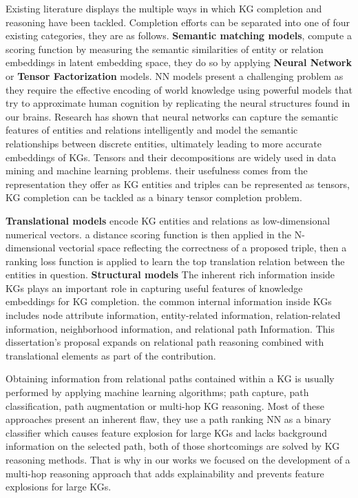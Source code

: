 Existing literature displays the multiple ways in which KG completion and reasoning have been tackled. Completion efforts can be separated into one of four existing categories\cite{shen2022comprehensive}, they are as follows.
\textbf{Semantic matching models}, compute a scoring function by measuring the semantic similarities of entity or relation embeddings in latent embedding space, they do so by applying \textbf{Neural Network} or \textbf{Tensor Factorization} models. 
NN models \cite{socher2013reasoning, tran2020multi} present a challenging problem as they require the effective encoding of world knowledge using powerful models that try to approximate human cognition by replicating the neural structures found in our brains. Research has shown that neural networks can capture the semantic features of entities and relations intelligently and model the semantic relationships between discrete entities, ultimately leading to more accurate embeddings of KGs.
Tensors\cite{nickel2011three, balavzevic2019tucker, socher2013reasoning, } and their decompositions are widely used in data mining and machine learning problems. their usefulness comes from the representation they offer as KG entities and triples can be represented as tensors, KG completion can be tackled as a binary tensor completion problem\cite{shen2022comprehensive}.

\textbf{Translational models}\cite{bordes2013translating, wang2014knowledge, lin2015learning, sun2019rotate, trouillon2016complex, dettmers2018conve} encode KG entities and relations as low-dimensional numerical vectors. a distance scoring function is then applied in the N-dimensional vectorial space reflecting the correctness of a proposed triple, then a ranking loss function is applied to learn the top translation relation between the entities in question.
\textbf{Structural models}\cite{mikolov2013efficient, pennington2014glove} The inherent rich information inside KGs plays an important role in capturing useful features of knowledge embeddings for KG completion. the common internal information inside KGs includes node attribute information, entity-related information, relation-related information, neighborhood information, and relational path Information. This dissertation's proposal expands on relational path reasoning combined with translational elements as part of the contribution.


Obtaining information from relational paths contained within a KG is usually performed by applying machine learning algorithms; path capture, path classification\cite{xiong2017deeppath}, path augmentation\cite{manchanda2023metapath, hirose2021transductive} or multi-hop KG reasoning\cite{lin2018multi, tiwari2021dapath, cui2023incorporating, cui2023reinforcement}. Most of these approaches present an inherent flaw, they use a path ranking NN as a binary classifier which causes feature explosion for large KGs and lacks background information on the selected path, both of those shortcomings are solved by KG reasoning methods. That is why in our works we focused on the development of a multi-hop reasoning approach that adds explainability and prevents feature explosions for large KGs.

